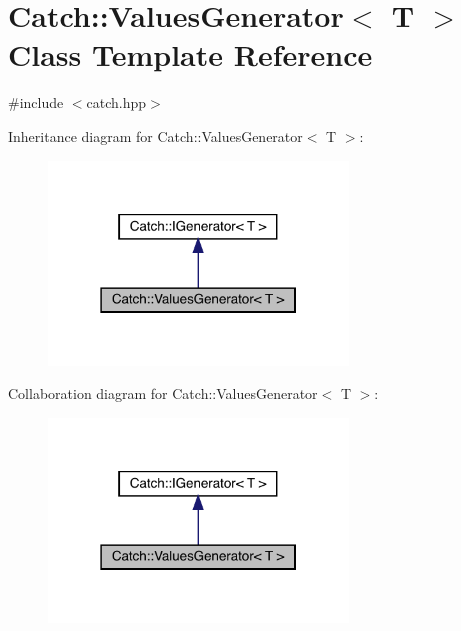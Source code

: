 \hypertarget{class_catch_1_1_values_generator}{}\section{Catch\+:\+:Values\+Generator$<$ T $>$ Class Template Reference}
\label{class_catch_1_1_values_generator}


{\ttfamily \#include $<$catch.\+hpp$>$}



Inheritance diagram for Catch\+:\+:Values\+Generator$<$ T $>$\+:
\nopagebreak
\begin{figure}[H]
\begin{center}
\leavevmode
\includegraphics[width=226pt]{class_catch_1_1_values_generator__inherit__graph}
\end{center}
\end{figure}


Collaboration diagram for Catch\+:\+:Values\+Generator$<$ T $>$\+:
\nopagebreak
\begin{figure}[H]
\begin{center}
\leavevmode
\includegraphics[width=226pt]{class_catch_1_1_values_generator__coll__graph}
\end{center}
\end{figure}
